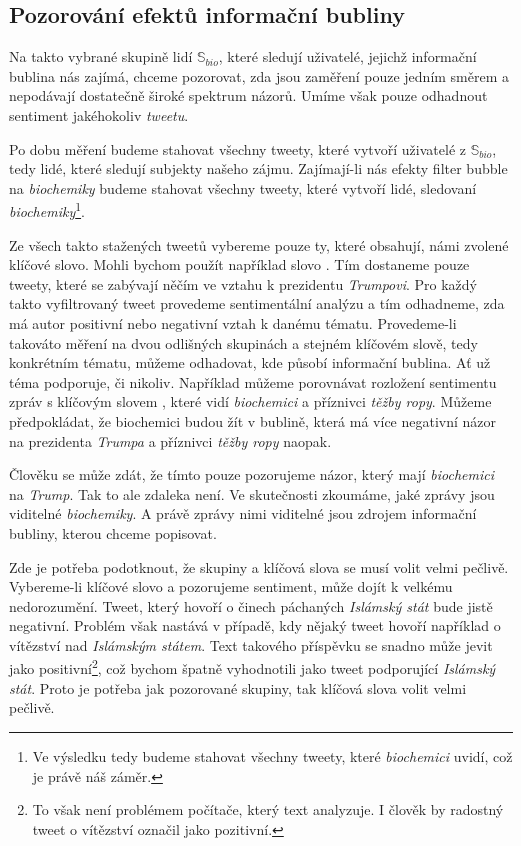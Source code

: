 \documentclass[12pt, a4paper]{article}
\numberwithin{equation}{section} 	%
\begin{document}
\subsection{Pozorování efektů informační bubliny}
\noindent Na takto vybrané skupině lidí $\mathbb{S}_{bio}$, které sledují uživatelé, jejichž informační bublina nás zajímá, chceme pozorovat, zda jsou zaměření pouze jedním směrem a nepodávají dostatečně široké spektrum názorů. Umíme však pouze odhadnout sentiment jakéhokoliv \textit{tweetu}.

Po dobu měření budeme stahovat všechny tweety, které vytvoří uživatelé z $\mathbb{S}_{bio}$, tedy lidé, které sledují subjekty našeho zájmu. Zajímají-li nás efekty filter bubble na \textit{biochemiky} budeme stahovat všechny tweety, které vytvoří lidé, sledovaní \textit{biochemiky}\footnote{Ve výsledku tedy budeme stahovat všechny tweety, které \textit{biochemici} uvidí, což je právě náš záměr.}.

Ze všech takto stažených tweetů vybereme pouze ty, které obsahují, námi zvolené klíčové slovo. Mohli bychom použít například slovo \textit{}. Tím dostaneme pouze tweety, které se zabývají něčím ve vztahu k prezidentu \textit{Trumpovi}. Pro každý takto vyfiltrovaný tweet provedeme sentimentální analýzu a tím odhadneme, zda má autor positivní nebo negativní vztah k danému tématu. Provedeme-li takováto měření na dvou odlišných skupinách a stejném klíčovém slově, tedy konkrétním tématu, můžeme odhadovat, kde působí informační bublina. Ať už téma podporuje, či nikoliv. Například můžeme porovnávat rozložení sentimentu zpráv s klíčovým slovem \textit{}, které vidí \textit{biochemici} a příznivci \textit{těžby ropy}. Můžeme předpokládat, že biochemici budou žít v bublině, která má více negativní názor na prezidenta \textit{Trumpa} a příznivci \textit{těžby ropy} naopak.

Člověku se může zdát, že tímto pouze pozorujeme názor, který mají \textit{biochemici} na \textit{Trump}. Tak to ale zdaleka není. Ve skutečnosti zkoumáme, jaké zprávy jsou viditelné \textit{biochemiky}. A právě zprávy nimi viditelné jsou zdrojem informační bubliny, kterou chceme popisovat.

Zde je potřeba podotknout, že skupiny a klíčová slova se musí volit velmi pečlivě. Vybereme-li klíčové slovo \textit{} a pozorujeme sentiment, může dojít k velkému nedorozumění. Tweet, který hovoří o činech páchaných \textit{Islámský stát} bude jistě negativní. Problém však nastává v případě, kdy nějaký tweet hovoří například o vítězství nad \textit{Islámským státem}. Text takového příspěvku se snadno může jevit jako positivní\footnote{To však není problémem počítače, který text analyzuje. I člověk by radostný tweet o vítězství označil jako pozitivní.}, což bychom špatně vyhodnotili jako tweet podporující \textit{Islámský stát}. Proto je potřeba jak pozorované skupiny, tak klíčová slova volit velmi pečlivě.
\end{document}
